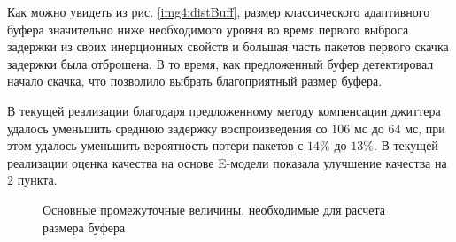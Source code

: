 Как можно увидеть из рис. \ref{img4:distBuff}, размер классического адаптивного буфера значительно ниже необходимого уровня во время первого выброса задержки из своих инерционных свойств и большая часть пакетов первого скачка задержки была отброшена.
В то время, как предложенный буфер детектировал начало скачка, что позволило выбрать благоприятный размер буфера.


В текущей реализации благодаря предложенному методу компенсации джиттера удалось уменьшить среднюю задержку воспроизведения со $106$ мс до $64$ мс, при этом удалось уменьшить вероятность потери пакетов с $14\%$ до $13\%$.
В текущей реализации оценка качества на основе E-модели показала улучшение качества на 2 пункта.





\pgfplotsset{width=15cm, height=10cm, compat=1.3}
\begin{figure} [!h]
  \center
{}
\caption{Основные промежуточные величины, необходимые для расчета размера буфера}
  \label{img4:distEst}
\end{figure}




